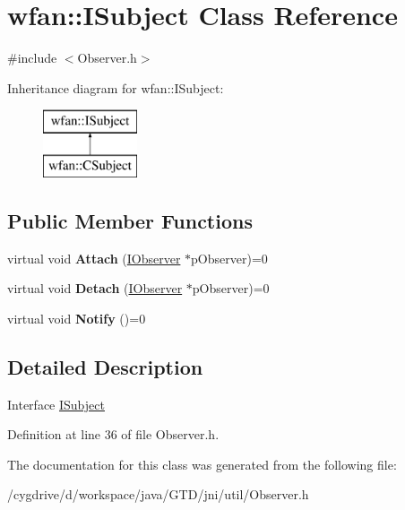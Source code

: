 \hypertarget{classwfan_1_1ISubject}{\section{wfan\-:\-:I\-Subject Class Reference}
\label{classwfan_1_1ISubject}
}


{\ttfamily \#include $<$Observer.\-h$>$}

Inheritance diagram for wfan\-:\-:I\-Subject\-:\begin{figure}[H]
\begin{center}
\leavevmode
\includegraphics[height=2.000000cm]{classwfan_1_1ISubject}
\end{center}
\end{figure}
\subsection*{Public Member Functions}
\begin{DoxyCompactItemize}
\item 
\hypertarget{classwfan_1_1ISubject_a792e5eccd46e4f45adbb9d2c9b294f16}{virtual void {\bfseries Attach} (\hyperlink{classwfan_1_1IObserver}{I\-Observer} $\ast$p\-Observer)=0}\label{classwfan_1_1ISubject_a792e5eccd46e4f45adbb9d2c9b294f16}

\item 
\hypertarget{classwfan_1_1ISubject_ab7ee968f5fec5937d469c8c5e97ca99b}{virtual void {\bfseries Detach} (\hyperlink{classwfan_1_1IObserver}{I\-Observer} $\ast$p\-Observer)=0}\label{classwfan_1_1ISubject_ab7ee968f5fec5937d469c8c5e97ca99b}

\item 
\hypertarget{classwfan_1_1ISubject_a6e3e9ed80f6e6e838979f7460303c65e}{virtual void {\bfseries Notify} ()=0}\label{classwfan_1_1ISubject_a6e3e9ed80f6e6e838979f7460303c65e}

\end{DoxyCompactItemize}


\subsection{Detailed Description}
Interface \hyperlink{classwfan_1_1ISubject}{I\-Subject} 

Definition at line 36 of file Observer.\-h.



The documentation for this class was generated from the following file\-:\begin{DoxyCompactItemize}
\item 
/cygdrive/d/workspace/java/\-G\-T\-D/jni/util/Observer.\-h\end{DoxyCompactItemize}
